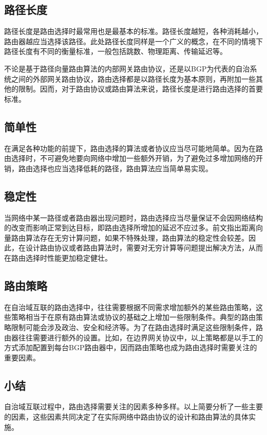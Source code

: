 \documentclass[11pt,twocolumn]{article}
\begin{document}
\subsection{路径长度}
路径长度是路由选择时最常用也是最基本的标准。路径长度越短，各种消耗越小，路由器越应当选择该路径。此处路径长度同样是一个广义的概念，在不同的情境下路径长度有不同的衡量标准，一般包括跳数、物理距离、传输延迟等。

不论是基于路径向量路由算法的内部网关路由协议，还是以BGP为代表的自治系统之间的外部网关路由协议，路由选择都是以路径长度为基本原则，再附加一些其他的限制。因而，对于路由协议或路由算法来说，路径长度是进行路由选择的首要标准。

\subsection{简单性}
在满足各种功能的前提下，路由选择的算法或者协议应当尽可能地简单。因为在路由选择时，不可避免地要向网络中增加一些额外开销，为了避免过多增加网络的开销，路由选择也应当选择低耗的路径，路由算法应当简单易实现。

\subsection{稳定性}
当网络中某一路径或者路由器出现问题时，路由选择应当尽量保证不会因网络结构的改变而影响正常到达目标，即路由选择所增加的延迟不应过多。前文指出距离向量路由算法存在无穷计算问题，如果不特殊处理，路由算法的稳定性会较差。因此，在设计路由协议或者路由算法时，需要对无穷计算等问题提出解决方法，从而在路由选择时性能更加稳定健壮。

\subsection{路由策略}
在自治域互联的路由选择中，往往需要根据不同需求增加额外的某些路由策略，这些策略相当于在原有路由算法或协议的基础之上增加一些限制条件\cite{Policy}。典型的路由策略限制可能会涉及政治、安全和经济等。为了在路由选择时满足这些限制条件，路由器往往需要进行额外的设置。比如，在边界网关协议中，以上策略都是以手工的方式添加配置到每台BGP路由器中，因而路由策略也成为路由选择时需要关注的重要因素。

\subsection{小结}
自治域互联过程中，路由选择需要关注的因素多种多样。以上简要分析了一些主要的因素，这些因素共同决定了在实际网络中路由协议的设计和路由算法的具体实施。
\end{document}
